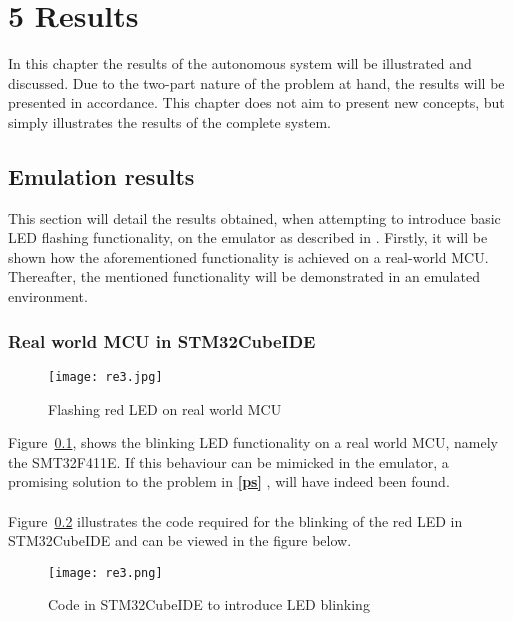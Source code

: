 

\chapter*{5 Results}
\label{results}
\setcounter{chapter}{5}
\setcounter{section}{0}
\setcounter{figure}{0}
\setcounter{table}{0}

In this chapter the results of the autonomous system will be illustrated and discussed. Due to the two-part nature of the problem at hand, the results will be presented in accordance. This chapter does not aim to present new concepts, but simply illustrates the results of the complete system.

\section{Emulation results} 
\label{emuRes}
This section will detail the results obtained, when attempting to introduce basic LED flashing functionality, on the emulator as described in \textbf{}. Firstly, it will be shown how the aforementioned functionality is achieved on a real-world MCU. Thereafter, the mentioned functionality will be demonstrated in an emulated environment.
\subsection{Real world MCU in STM32CubeIDE}
\label{real}

\begin{figure}[H]
\begin{center}
\texttt{[image: re3.jpg]}
\caption{Flashing red LED on real world MCU}
\label{re3.1}
\end{center}
\end{figure}

Figure~\ref{re3.1}, shows the blinking LED functionality on a real world MCU, namely the SMT32F411E. If this behaviour can be mimicked in the emulator, a promising solution to the problem in \textbf{\ref{ps} }, will have indeed been found.
\\\\
Figure~\ref{re3.2} illustrates the code required for the blinking of the red LED in STM32CubeIDE and can be viewed in the figure below.

\begin{figure}[H]
\begin{center}
\texttt{[image: re3.png]}
\caption{Code in STM32CubeIDE to introduce LED blinking}
\label{re3.2}
\end{center}
\end{figure}




